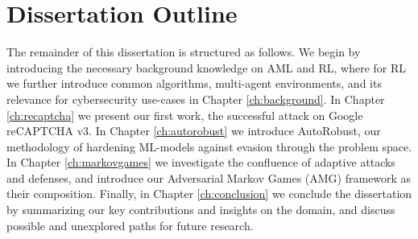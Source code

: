\begin{myleftbar}
\end{myleftbar}

\section{Dissertation Outline}

The remainder of this dissertation is structured as follows.
We begin by introducing the necessary background knowledge on \gls{AML} and \gls{RL}, where for \gls{RL} we further introduce common algorithms, multi-agent environments, and its relevance for cybersecurity use-cases in Chapter \ref{ch:background}.
In Chapter \ref{ch:recaptcha} we present our first work, the successful attack on Google reCAPTCHA v3.
In Chapter \ref{ch:autorobust} we introduce AutoRobust, our methodology of hardening ML-models against evasion through the problem space.
In Chapter \ref{ch:markovgames} we investigate the confluence of adaptive attacks and defenses, and introduce our Adversarial Markov Games (AMG) framework as their composition.
Finally, in Chapter \ref{ch:conclusion} we conclude the dissertation by summarizing our key contributions and insights on the domain, and discuss possible and unexplored paths for future research.

\cleardoublepage

